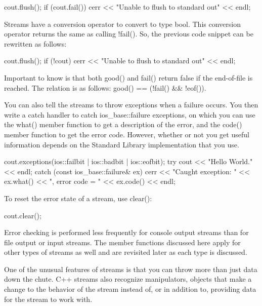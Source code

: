 \begin{cpp}
cout.flush();
if (cout.fail()) {
    cerr << "Unable to flush to standard out" << endl;
}
\end{cpp}

Streams have a conversion operator to convert to type bool. This conversion operator returns the same as calling !fail(). So, the previous code snippet can be rewritten as follows:

\begin{cpp}
cout.flush();
if (!cout) {
    cerr << "Unable to flush to standard out" << endl;
}
\end{cpp}

Important to know is that both good() and fail() return false if the end-of-file is reached. The relation is as follows: good() == (!fail() \&\& !eof()).

You can also tell the streams to throw exceptions when a failure occurs. You then write a catch handler to catch ios\_base::failure exceptions, on which you can use the what() member function to get a description of the error, and the code() member function to get the error code. However, whether or not you get useful information depends on the Standard Library implementation that you use.

\begin{cpp}
cout.exceptions(ios::failbit | ios::badbit | ios::eofbit);
try {
    cout << "Hello World." << endl;
} catch (const ios_base::failure& ex) {
    cerr << "Caught exception: " << ex.what()
    << ", error code = " << ex.code() << endl;
}
\end{cpp}

To reset the error state of a stream, use clear():

\begin{cpp}
cout.clear();
\end{cpp}

Error checking is performed less frequently for console output streams than for file output or input streams. The member functions discussed here apply for other types of streams as well and are revisited later as each type is discussed.



One of the unusual features of streams is that you can throw more than just data down the chute. C++ streams also recognize manipulators, objects that make a change to the behavior of the stream instead of, or in addition to, providing data for the stream to work with.

